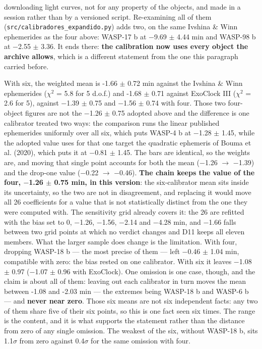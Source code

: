 \documentclass{aa}
\begin{document}
downloading light curves, not for any property of the objects, and made in a session rather than by a versioned script. Re-examining all of them (\texttt{src/\allowbreak calibradores\_\allowbreak expandido.py}) adds two, on the same Ivshina \& Winn ephemerides as the four above: WASP-17 b at $-$9.69 $\pm$ 4.44 min and WASP-98 b at $-$2.55 $\pm$ 3.36. It ends there: \textbf{the calibration now uses every object the archive allows}, which is a different statement from the one this paragraph carried before.

With six, the weighted mean is -1.66 $\pm$ 0.72 min against the Ivshina \& Winn ephemerides ($\chi^2$ = 5.8 for 5 d.o.f.) and -1.68 $\pm$ 0.71 against ExoClock III ($\chi^2$ = 2.6 for 5), against $-$1.39 $\pm$ 0.75 and $-$1.56 $\pm$ 0.74 with four. Those two four-object figures are not the $-$1.26 $\pm$ 0.75 adopted above and the difference is one calibrator treated two ways: the comparison runs the linear published ephemerides uniformly over all six, which puts WASP-4 b at $-$1.28 $\pm$ 1.45, while the adopted value uses for that one target the quadratic ephemeris of Bouma et al. (2020), which puts it at $-$0.81 $\pm$ 1.45. The bars are identical, so the weights are, and moving that single point accounts for both the mean ($-$1.26 $\rightarrow$ $-$1.39) and the drop-one value ($-$0.22 $\rightarrow$ $-$0.46). \textbf{The chain keeps the value of the four, $-$1.26 $\pm$ 0.75 min, in this version}: the six-calibrator mean sits inside its uncertainty, so the two are not in disagreement, and replacing it would move all 26 coefficients for a value that is not statistically distinct from the one they were computed with. The sensitivity grid already covers it: the 26 are refitted with the bias set to 0, $-$1.26, $-$1.56, $-$2.14 and $-$4.28 min, and $-$1.66 falls between two grid points at which no verdict changes and D11 keeps all eleven members. What the larger sample does change is the limitation. With four, dropping WASP-18 b --- the most precise of them --- left $-$0.46 $\pm$ 1.04 min, compatible with zero: the bias rested on one calibrator. With six it leaves $-$1.08 $\pm$ 0.97 ($-$1.07 $\pm$ 0.96 with ExoClock). One omission is one case, though, and the claim is about all of them: leaving out each calibrator in turn moves the mean between -1.08 and -2.03 min --- the extremes being WASP-18 b and WASP-6 b --- and \textbf{never near zero}. Those six means are not six independent facts: any two of them share five of their six points, so this is one fact seen six times. The range is the content, and it is what supports the statement rather than the distance from zero of any single omission. The weakest of the six, without WASP-18 b, sits 1.1$\sigma$ from zero against 0.4$\sigma$ for the same omission with four.
\end{document}
